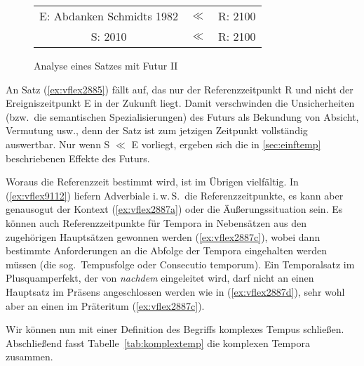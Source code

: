 \begin{figure}
  \centering
  \begin{tabular}{ccc}
    E: Abdanken Schmidts 1982 & $\ll$ & R: 2100 \\
    S: 2010 & $\ll$ & R: 2100 \\
  \end{tabular}
  \caption{Analyse eines Satzes mit Futur II}
  \label{fig:reif2-bsp2}
\end{figure}

An Satz (\ref{ex:vflex2885}) fällt auf, das nur der Referenzzeitpunkt R und nicht der Ereigniszeitpunkt E in der Zukunft liegt.
Damit verschwinden die Unsicherheiten (bzw.\ die semantischen Spezialisierungen) des Futurs als Bekundung von Absicht, Vermutung usw., denn der Satz ist zum jetzigen Zeitpunkt vollständig auswertbar.
Nur wenn S $\ll$ E vorliegt, ergeben sich die in \ref{sec:einftemp} beschriebenen Effekte des Futurs.


Woraus die Referenzzeit bestimmt wird, ist im Übrigen vielfältig.
In (\ref{ex:vflex9112}) liefern Adverbiale i.\,w.\,S.\ die Referenzzeitpunkte, es kann aber genausogut der Kontext (\ref{ex:vflex2887a}) oder die Äußerungssituation sein.
Es können auch Referenzzeitpunkte für Tempora in Nebensätzen aus den zugehörigen Hauptsätzen gewonnen werden (\ref{ex:vflex2887c}), wobei dann bestimmte Anforderungen an die Abfolge der Tempora eingehalten werden müssen (die sog.\ Tempusfolge oder Consecutio temporum).
Ein Temporalsatz im Plusquamperfekt, der von \textit{nachdem} eingeleitet wird, darf \zB nicht an einen Hauptsatz im Präsens angeschlossen werden wie in (\ref{ex:vflex2887d}), sehr wohl aber an einen im Präteritum (\ref{ex:vflex2887c}).

\begin{exe}
  \ex\label{ex:vflex2887b}
  \begin{xlist}
  \end{xlist}
\end{exe}

Wir können nun mit einer Definition des Begriffs komplexes Tempus schließen.
Abschließend fasst Tabelle~\ref{tab:komplextemp} die komplexen Tempora zusammen.


